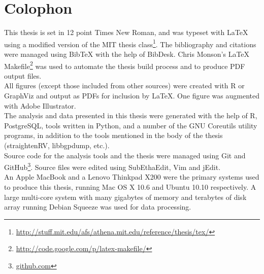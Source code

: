 {}
\chapter*{Colophon}
\begin{singlespace}
\noindent
This thesis is set in 12 point Times New Roman, and was typeset with \LaTeX{}
using a modified version of the MIT thesis class\footnote{
\url{http://stuff.mit.edu/afs/athena.mit.edu/reference/thesis/tex/}}.
The bibliography and citations were managed using {{\sc Bib}\TeX} with the help
of BibDesk. Chris Monson's \LaTeX{} Makefile\footnote{
\url{http://code.google.com/p/latex-makefile/}} was used to automate the thesis
build process and to produce PDF output files.
\\

\noindent
All figures (except those included from other sources) were created with R or
GraphViz and output as PDFs for inclusion by \LaTeX{}. One figure was augmented
with Adobe Illustrator.
\\

\noindent
The analysis and data presented in this thesis were generated with the help of
R, PostgreSQL, tools written in Python, and a number of the GNU Coreutils
utility programs, in addition to the tools mentioned in the body of the thesis
(straightenRV, libbgpdump, etc.).
\\

\noindent
Source code for the analysis tools and the thesis were managed using Git and
GitHub\footnote{\url{github.com}}. Source files were edited using SubEthaEdit,
Vim and jEdit.
\\

\noindent
An Apple MacBook and a Lenovo Thinkpad X200 were the primary systems used to
produce this thesis, running Mac OS X 10.6 and Ubuntu 10.10 respectively. A
large multi-core system with many gigabytes of memory and terabytes of disk
array running Debian Squeeze was used for data processing.
\\

\end{singlespace}
